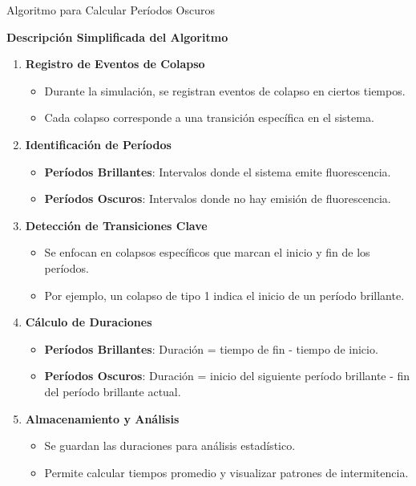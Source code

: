 \documentclass[11pt]{beamer}
\begin{document}
\begin{frame}{Algoritmo para Calcular Períodos Oscuros}
    
    \textbf{Descripción Simplificada del Algoritmo}
    
    \begin{enumerate} \item \textbf{Registro de Eventos de Colapso} \begin{itemize} \item Durante la simulación, se registran eventos de colapso en ciertos tiempos. \item Cada colapso corresponde a una transición específica en el sistema. \end{itemize} \vspace{0.5em} \item \textbf{Identificación de Períodos} \begin{itemize} \item \textbf{Períodos Brillantes}: Intervalos donde el sistema emite fluorescencia. \item \textbf{Períodos Oscuros}: Intervalos donde no hay emisión de fluorescencia. \end{itemize} \vspace{0.5em} \item \textbf{Detección de Transiciones Clave} \begin{itemize} \item Se enfocan en colapsos específicos que marcan el inicio y fin de los períodos. \item Por ejemplo, un colapso de tipo 1 indica el inicio de un período brillante. \end{itemize} \vspace{0.5em} \item \textbf{Cálculo de Duraciones} \begin{itemize} \item \textbf{Períodos Brillantes}: Duración = tiempo de fin - tiempo de inicio. \item \textbf{Períodos Oscuros}: Duración = inicio del siguiente período brillante - fin del período brillante actual. \end{itemize} \vspace{0.5em} \item \textbf{Almacenamiento y Análisis} \begin{itemize} \item Se guardan las duraciones para análisis estadístico. \item Permite calcular tiempos promedio y visualizar patrones de intermitencia. \end{itemize} \end{enumerate}
    
\end{frame}
\end{document}
